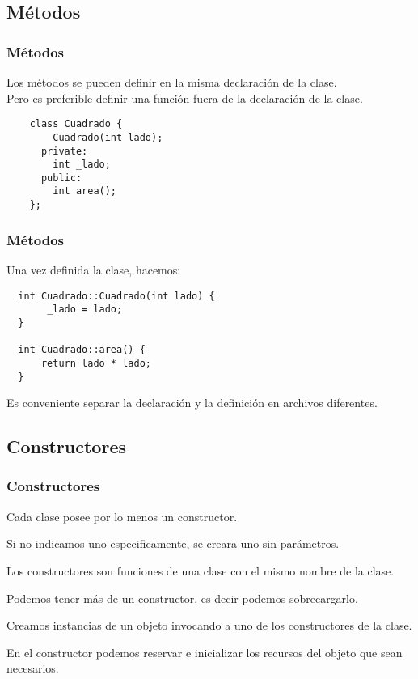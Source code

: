 \documentclass{beamer}
\begin{document}
\subsection{Métodos}
\begin{frame}[fragile]
\frametitle{Métodos}
   Los métodos se pueden definir en la misma declaración de la clase. \\
   Pero es preferible definir una función fuera de la declaración de la clase. 
   \begin{verbatim}
    class Cuadrado {
        Cuadrado(int lado);
      private:
        int _lado;
      public:
        int area();
    };
\end{verbatim}
\end{frame}

\begin{frame}[fragile]
\frametitle{Métodos}
   
   Una vez definida la clase, hacemos:
\begin{verbatim}
  int Cuadrado::Cuadrado(int lado) {
       _lado = lado;
  }

  int Cuadrado::area() {
      return lado * lado;
  }
\end{verbatim}

\begin{block}{}
Es conveniente separar la declaración y la definición en archivos diferentes.
\end{block}
\end{frame}

\subsection{Constructores}

\begin{frame}[fragile]
\frametitle{Constructores}

Cada clase posee por lo menos un constructor.

Si no indicamos uno especificamente, se creara uno sin parámetros.

Los constructores son funciones de una clase con el mismo nombre de la clase.

Podemos tener más de un constructor, es decir podemos sobrecargarlo.

Creamos instancias de un objeto invocando a uno de los constructores de la clase.

En el constructor podemos reservar e inicializar los recursos del objeto que sean necesarios.

\end{frame}
\end{document}
